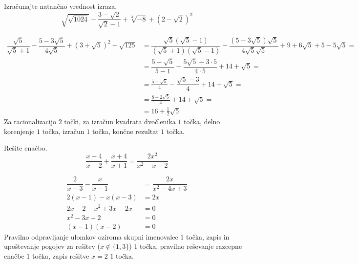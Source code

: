 \documentclass[addpoints]{exam}
\begin{document}
\begin{questions}


    \question[6]
    Izračunajte natančno vrednost izraza.
    $$ \sqrt{\sqrt{1024}}-\dfrac{3-\sqrt{2}}{\sqrt{2}-1}+\sqrt[3]{-8}+\left(2-\sqrt{2}\right)^2 $$

    \begin{solution}[7cm]
        \begin{align*} 
            \dfrac{\sqrt{5}}{\sqrt{5}+1}-\dfrac{5-3\sqrt{5}}{4\sqrt{5}}+\left(3+\sqrt{5}\right)^2-\sqrt{125}&=\dfrac{\sqrt{5}(\sqrt{5}-1)}{(\sqrt{5}+1)(\sqrt{5}-1)}-\dfrac{(5-3\sqrt{5})\sqrt{5}}{4\sqrt{5}\sqrt{5}}+9+6\sqrt{5}+5-5\sqrt{5}= \\
                                                                                                            &=\dfrac{5-\sqrt{5}}{5-1}-\dfrac{5\sqrt{5}-3\cdot 5}{4\cdot 5}+14+\sqrt{5}= \\
                                                                                                            &=\frac{5-\sqrt{5}}{4}-\dfrac{\sqrt{5}-3}{4}+14+\sqrt{5}= \\
                                                                                                            &=\frac{8-2\sqrt{5}}{4}+14+\sqrt{5}= \\
                                                                                                            &=16+\frac{1}{2}\sqrt{5}
        \end{align*}
        Za racionalizacijo $2$ točki, za izračun kvadrata dvočlenika $1$ točka, delno korenjenje $1$ točka, izračun $1$ točka, končne rezultat $1$ točka.
    \end{solution}
    
    

    \question[4]
    Rešite enačbo.
    $$ \dfrac{x-4}{x-2}+\dfrac{x+4}{x+1}=\dfrac{2x^2}{x^2-x-2} $$
    
    
    \begin{solution}[4cm]
        \begin{align*} 
            \dfrac{2}{x-3}-\dfrac{x}{x-1} &=\dfrac{2x}{x^2-4x+3} \\
            2(x-1)-x(x-3) &= 2x \\
            2x-2-x^2+3x-2x &=0 \\
            x^2-3x+2 &=0 \\
            (x-1)(x-2) &=0
        \end{align*}
        Pravilno odpravljanje ulomkov oziroma skupni imenovalec $1$ točka, zapis in upoštevanje pogojev za rešitev ($x\notin\{1,3\}$) $1$ točka, pravilno reševanje razcepne enačbe $1$ točka, zapis rešitve $x=2$ $1$ točka.
    \end{solution}


\end{questions}
\end{document}
